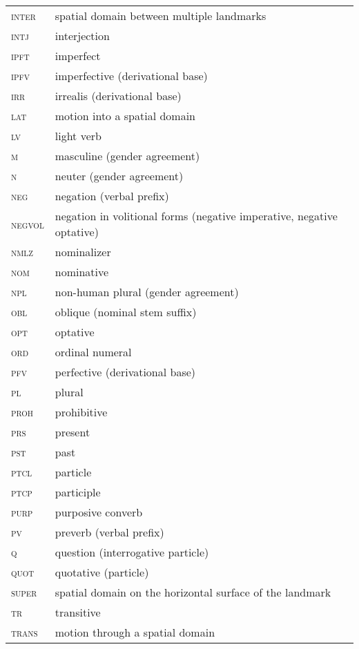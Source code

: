 ﻿\documentclass[output=paper]{langsci/langscibook}
\begin{document}
\begin{longtable}[l]{@{}ll@{}}
\textsc{inter}	& spatial domain between multiple landmarks \\
\textsc{intj}	& interjection \\
\textsc{ipft}	& imperfect \\
\textsc{ipfv}	& imperfective (derivational base) \\
\textsc{irr}	& irrealis (derivational base) \\
\textsc{lat}	& motion into a spatial domain \\
\textsc{lv}	& light verb \\
\textsc{m}	& masculine (gender agreement) \\
\textsc{n}	& neuter (gender agreement) \\
\textsc{neg}	& negation (verbal prefix) \\
\textsc{negvol}	& negation in volitional forms (negative imperative, negative optative) \\
\textsc{nmlz}	& nominalizer \\
\textsc{nom}	& nominative \\
\textsc{npl}	& non-human plural (gender agreement) \\
\textsc{obl}	& oblique (nominal stem suffix) \\
\textsc{opt}	& optative \\
\textsc{ord}	& ordinal numeral \\
\textsc{pfv}	& perfective (derivational base) \\
\textsc{pl}	& plural \\
\textsc{proh}	& prohibitive \\
\textsc{prs}	& present \\
\textsc{pst}	& past \\
\textsc{ptcl}	& particle \\
\textsc{ptcp}	& participle \\
\textsc{purp}	& purposive converb \\
\textsc{pv}	& preverb (verbal prefix) \\
\textsc{q}	& question (interrogative particle) \\
\textsc{quot}	& quotative (particle) \\
\textsc{super}	& spatial domain on the horizontal surface of the landmark \\
\textsc{tr}	& transitive \\
\textsc{trans}	& motion through a spatial domain \\
\end{longtable}

\printbibliography[heading=subbibliography,notkeyword=this]
\end{document}
